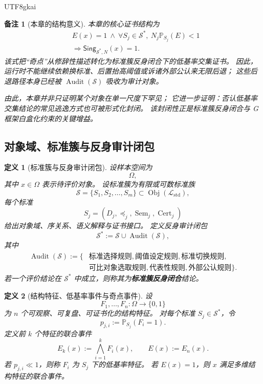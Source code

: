 \documentclass[12pt]{article}
\newtheorem{definition}{定义}[section]
\newtheorem{remark}{备注}[section]
\newcommand{\Std}{\mathcal L_{\mathrm{std}}}
\newcommand{\Sem}{\operatorname{Sem}}
\newcommand{\Cert}{\operatorname{Cert}}
\newcommand{\Obj}{\operatorname{Obj}}
\newcommand{\Audit}{\operatorname{Audit}}
\begin{document}
\begin{CJK*}{UTF8}{gkai}
\begin{remark}[本章的结构意义]
本章的核心证书结构为
\[
\boxed{
\begin{aligned}
  &E(x)=1
  \ \wedge\
  \forall S_j\in\mathcal S^\ast,\ N_j\mathbb P_{S_j}(E)<1\\
  &\Longrightarrow
  \mathsf{Sing}_{\mathcal S^\ast,N}(x)=1.
\end{aligned}
}
\]
该式把“奇点”从修辞性描述转化为标准簇反身闭合下的低基率交集证书。
因此，运行时不能继续依赖换标准、后置抬高阈值或诉诸外部公认来无限后退；
这些后退路径本身已经被 \(\Audit(\mathcal S)\) 吸收为审计对象。

由此，本章并非只证明某个对象在单一尺度下罕见；
它进一步证明：否认低基率交集结论的常见逃逸方式也可被形式化封闭。
该封闭性正是标准簇反身闭合与 G 框架白盒化约束的关键增益。
\end{remark}

\subsection{对象域、标准簇与反身审计闭包}
\label{subsec:tex51-reflexive-domain}

\begin{definition}[标准簇与反身审计闭包]
\label{def:tex51-standard-cluster-closure}
设样本空间为
\[
  \Omega,
\]
其中 \(x\in\Omega\) 表示待评价对象。
设标准簇为有限或可数标准族
\[
  \mathcal S=\{S_1,S_2,\ldots,S_m\}\subset \Obj(\Std),
\]
每个标准
\[
  S_j=(D_j,\preceq_j,\Sem_j,\Cert_j)
\]
给出对象域、序关系、语义解释与证书接口。
定义反身审计闭包
\[
  \mathcal S^\ast
  :=
  \mathcal S\cup\Audit(\mathcal S),
\]
其中
\[
\begin{aligned}
  \Audit(\mathcal S)
  :=
  \{&
  \text{标准选择规则},
  \text{阈值设定规则},
  \text{标准切换规则},\\
  &\text{可比对象选取规则},
  \text{代表性规则},
  \text{外部公认规则}
  \}.
\end{aligned}
\]
若一个评价结论在 \(\mathcal S^\ast\) 中成立，则称其为\textbf{标准簇反身闭合}结论。
\end{definition}

\begin{definition}[结构特征、低基率事件与奇点事件]
\label{def:tex51-singularity-event}
设
\[
  F_1,\ldots,F_n:\Omega\to\{0,1\}
\]
为 \(n\) 个可观察、可复盘、可证书化的结构特征。
对每个标准 \(S_j\in\mathcal S^\ast\)，令
\[
  p_{j,i}:=\mathbb P_{S_j}(F_i=1).
\]
定义前 \(k\) 个特征的联合事件
\[
  E_k(x):=\bigwedge_{i=1}^{k}F_i(x),
  \qquad
  E(x):=E_n(x).
\]
若 \(p_{j,i}\ll 1\)，则称 \(F_i\) 为 \(S_j\) 下的低基率特征。
若 \(E(x)=1\)，则 \(x\) 满足多维结构特征的联合事件。
\end{definition}


\end{CJK*}
\end{document}
